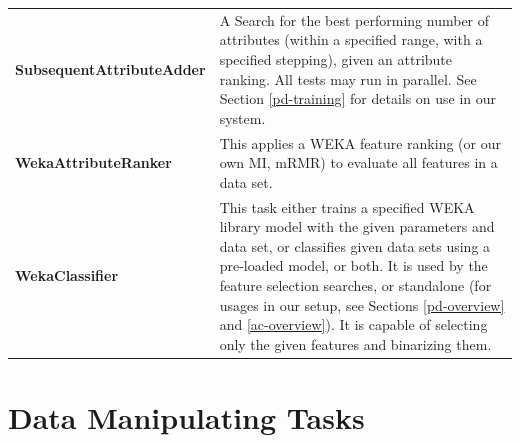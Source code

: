 \documentclass[12pt,notitlepage]{report}
\begin{document}
\begin{longtable}{p{}p{}}
\bf SubsequentAttributeAdder & A Search for the best performing number of attributes (within a specified range, with a specified stepping), given an attribute ranking. All tests may run in parallel. See Section \ref{pd-training} for details on use in our system. \\
\bf WekaAttributeRanker & This applies a WEKA feature ranking (or our own MI, mRMR) to evaluate all features in a data set. \\
\bf WekaClassifier  & This task either trains a specified WEKA library model with the given parameters and data set, or classifies given data sets using a pre-loaded model, or both. It is used by the feature selection searches, or standalone (for usages in our setup, see Sections \ref{pd-overview} and \ref{ac-overview}). It is capable of selecting only the given features and binarizing them. \\
\end{longtable}

\section*{Data Manipulating Tasks}
\end{document}
